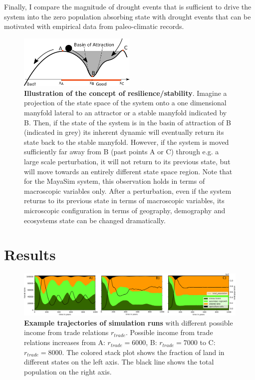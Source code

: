Finally, I compare the magnitude of drought events that is sufficient to drive the system into the zero population absorbing state with drought events that can be motivated with empirical data from paleo-climatic records.

\begin{figure}[!t]
\centering
\includegraphics[width=0.5\textwidth]{figures/Basin_Stability.pdf}
\caption{\textbf{Illustration of the concept of resilience/stability}. Imagine a projection of the state space of the system onto a one dimensional manyfold lateral to an attractor or a stable manyfold indicated by B. Then, if the state of the system is in the basin of attraction of B (indicated in grey) its inherent dynamic will eventually return its state back to the stable manyfold. However, if the system is moved sufficiently far away from B (past points A or C) through e.g. a large scale perturbation, it will not return to its previous state, but will move towards an entirely different state space region. Note that for the MayaSim system, this observation holds in terms of macroscopic variables only. After a perturbation, even if the system returns to its previous state in terms of macroscopic variables, its microscopic configuration in terms of geography, demography and ecosystems state can be changed dramatically.}
\label{fig:basin_stability}
\end{figure}

\section{Results}
\begin{figure}[!t]
\centering
\includegraphics[width=\textwidth]{figures/trajectory.pdf}
\caption{\textbf{Example trajectories of simulation runs} with different possible income from trade relations $r_{trade}$. Possible income from trade relations increases from A: $r_{trade}=6000$, B: $r_{trade}=7000$ to C: $r_{trade}=8000$. The colored stack plot shows the fraction of land in different states on the left axis. The black line shows the total population on the right axis.}
\label{fig:trajectory}
\end{figure}

